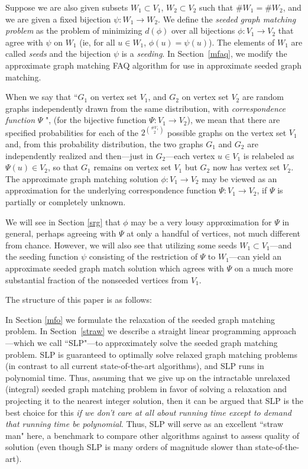 \documentclass[12pt]{article}
\begin{document}
Suppose we are also given subsets $W_1 \subset V_1$, $W_2 \subset V_2$
such that $\# W_1= \# W_2$, and we are given a
fixed bijection $\psi: W_1 \rightarrow W_2$.
We define the {\it seeded graph matching problem} as the problem of
minimizing $d(\phi)$ over all bijections $\phi : V_1 \rightarrow V_2$
that agree with $\psi$ on $W_1$ (ie, for all $u \in W_1$, $\phi(u)=\psi(u)$).
The elements of $W_1$ are called {\it seeds} and the bijection
$\psi$ is a {\it seeding}. In Section~\ref{mfaq},
we modify the  approximate graph matching FAQ algorithm for 
use in approximate seeded graph matching.


When we say that ``$G_1$ on vertex set $V_1$, and $G_2$ on vertex set $V_2$
are random graphs independently drawn from the same distribution,
with {\it correspondence function}  $\Psi$ ",
(for the bijective function $ \Psi: V_1 \rightarrow V_2$),
we mean that there are specified probabilities for each of the
$2^{\# V_1 \choose 2}$ possible graphs on the vertex set $V_1$ and,
 from this probability distribution, the two graphs $G_1$ and $G_2$ are
independently realized and then---just in $G_2$---each vertex $u \in V_1$
is relabeled as $\Psi(u) \in V_2$, so that $G_1$ remains on vertex set
$V_1$ but $G_2$ now has vertex set $V_2$. The approximate graph matching
solution $\phi:V_1 \rightarrow V_2$ may be viewed as an approximation
for the underlying correspondence function $\Psi: V_1 \rightarrow V_2$, if
$\Psi$ is partially or completely unknown.

We will see in Section \ref{srg} that $\phi$ may be a very lousy
approximation for $\Psi$ in general, perhaps agreeing with $\Psi$ at
only a handful of vertices, not much different from chance.
However, we will also see that utilizing
some seeds $W_1 \subset V_1$---and the seeding function $\psi$
consisting of the restriction of $\Psi$ to $W_1$---can yield an approximate
seeded graph match solution which agrees with $\Psi$ on a much
more substantial fraction of the nonseeded vertices from $V_1$.

The structure of this paper is as follows:

In Section \ref{mfo} we
formulate the relaxation of the seeded graph matching problem.
In Section~\ref{straw} we describe a straight linear programming
approach---which we call ``SLP"---to approximately solve the
seeded graph matching problem. SLP is guaranteed to optimally solve
relaxed graph matching problems
(in contrast to all current state-of-the-art algorithms), and
SLP runs in polynomial time. Thus, assuming that we give
up on the intractable unrelaxed (integral) seeded graph matching
problem in favor of solving a relaxation and projecting it to the nearest
integer solution, then it can be argued that SLP is the best
choice for this {\it if we don't care at all about running time
except to demand that running time be polynomial}.
Thus, SLP will serve as
an excellent ``straw man" here, a benchmark to compare other
algorithms against to assess quality of solution (even though SLP is
many orders of magnitude slower than state-of-the-art).
\end{document}
